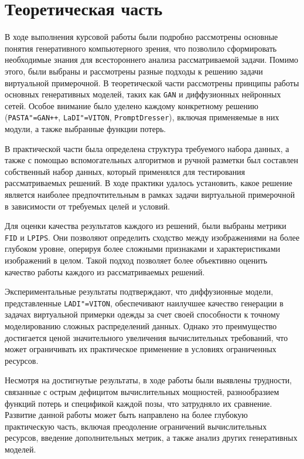\documentclass[bachelor]{SCWorks}
\begin{document}
\section{Теоретическая часть}






\newpage






 \newpage
\conclusion
В ходе выполнения курсовой работы были подробно рассмотрены основные понятия генеративного компьютерного зрения, что позволило сформировать необходимые знания для всестороннего анализа рассматриваемой задачи. Помимо этого, были выбраны и рассмотрены разные подходы к решению задачи виртуальной примерочной. В теоретической части рассмотрены принципы работы основных генеративных моделей, таких как \texttt{GAN} и диффузионных нейронных сетей. Особое внимание было уделено каждому конкретному решению (\texttt{PASTA"=GAN++}, \texttt{LaDI"=VITON}, \texttt{PromptDresser}), включая применяемые в них модули, а также выбранные функции потерь.

В практической части была определена структура требуемого набора данных, а также с помощью вспомогательных алгоритмов и ручной разметки был составлен собственный набор данных, который применялся для тестирования рассматриваемых решений. В ходе практики удалось установить, какое решение является наиболее предпочтительным в рамках задачи виртуальной примерочной в зависимости от требуемых целей и условий. 

Для оценки качества результатов каждого из решений, были выбраны метрики \texttt{FID} и \texttt{LPIPS}. Они позволяют определить сходство между изображениями на более глубоком уровне, оперируя более сложными признаками и характеристиками изображений в целом. Такой подход позволяет более объективно оценить качество работы каждого из рассматриваемых решений.

Экспериментальные результаты подтверждают, что диффузионные модели, представленные \texttt{LADI"=VITON}, обеспечивают наилучшее качество генерации в задачах виртуальной примерки одежды за счет своей способности к точному моделированию сложных распределений данных. Однако это преимущество достигается ценой значительного увеличения вычислительных требований, что может ограничивать их практическое применение в условиях ограниченных ресурсов.

Несмотря на достигнутые результаты, в ходе работы были выявлены трудности, связанные с острым дефицитом вычислительных мощностей, разнообразием функций потерь и спецификой каждой позы, что затрудняло их сравнение. Развитие данной работы может быть направлено на более глубокую практическую часть, включая преодоление ограничений вычислительных ресурсов, введение дополнительных метрик, а также анализ других генеративных моделей.
\end{document}
